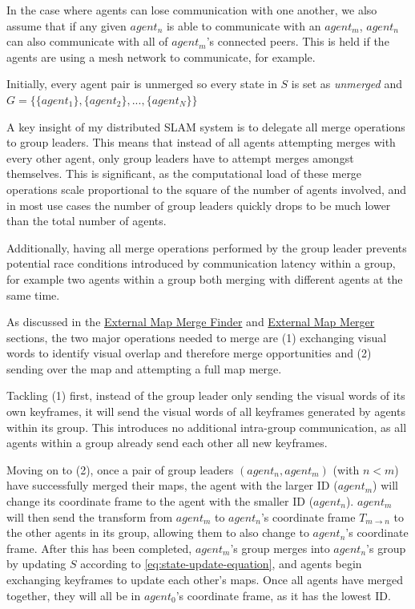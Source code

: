 In the case where agents can lose communication with one another, we also assume that if any given $agent_n$ is able to communicate with an $agent_m$, $agent_n$ can also communicate with all of $agent_m$'s connected peers. This is held if the agents are using a mesh network to communicate, for example.

Initially, every agent pair is unmerged so every state in $S$ is set as \textit{unmerged} and $G=\{\{agent_1\}, \{agent_2\}, ..., \{agent_N\}\}$

A key insight of my distributed SLAM system is to delegate all merge operations to group leaders. This means that instead of all agents attempting merges with every other agent, only group leaders have to attempt merges amongst themselves. This is significant, as the computational load of these merge operations scale proportional to the square of the number of agents involved, and in most use cases the number of group leaders quickly drops to be much lower than the total number of agents.

Additionally, having all merge operations performed by the group leader prevents potential race conditions introduced by communication latency within a group, for example two agents within a group both merging with different agents at the same time.

As discussed in the \hyperref[sec:external-map-merge-finder]{External Map Merge Finder} and \hyperref[sec:external-map-merger]{External Map Merger} sections, the two major operations needed to merge are (1) exchanging visual words to identify visual overlap and therefore merge opportunities and (2) sending over the map and attempting a full map merge.

Tackling (1) first, instead of the group leader only sending the visual words of its own keyframes, it will send the visual words of all keyframes generated by agents within its group. This introduces no additional intra-group communication, as all agents within a group already send each other all new keyframes.

Moving on to (2), once a pair of group leaders $(agent_n, agent_m)$ (with $n<m$) have successfully merged their maps, the agent with the larger ID ($agent_m$) will change its coordinate frame to the agent with the smaller ID ($agent_n$). $agent_m$ will then send the transform from $agent_m$ to $agent_n$'s coordinate frame $T_{m \to n}$ to the other agents in its group, allowing them to also change to $agent_n$'s coordinate frame. After this has been completed, $agent_m$'s group merges into $agent_n$'s group by updating $S$ according to \autoref{eq:state-update-equation}, and agents begin exchanging keyframes to update each other's maps. Once all agents have merged together, they will all be in $agent_0$'s coordinate frame, as it has the lowest ID.

